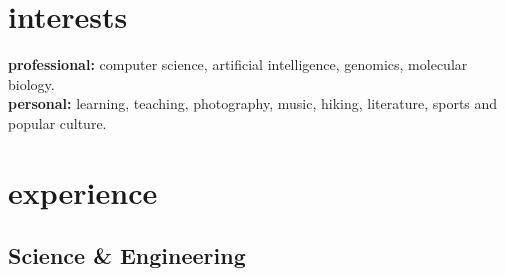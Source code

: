 \documentclass[]{friggeri-cv} %
\begin{document}
\section{interests}

\textbf{professional:} computer science, artificial intelligence, genomics, molecular
biology. \\
\textbf{personal:} learning, teaching, photography, music, hiking, literature, sports
and popular culture. \\


\section{experience}

\subsection{Science \& Engineering}
\end{document}
